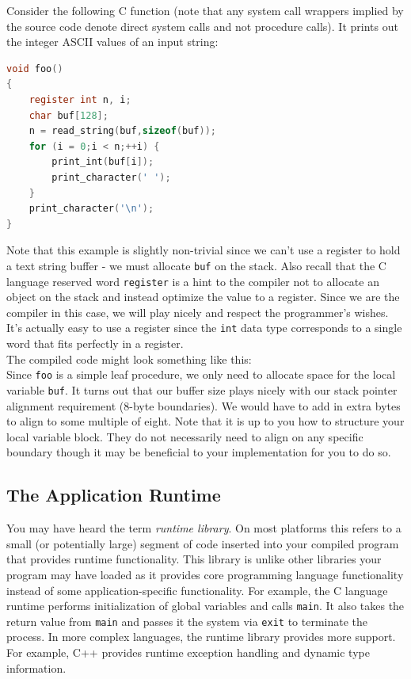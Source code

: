 \documentclass[12pt]{article}
\begin{document}
Consider the following C function (note that any system call wrappers implied by
     the source code denote direct system calls and not procedure calls). It
     prints out the integer ASCII values of an input string:\\

\begin{lstlisting}[language=C]
void foo()
{
    register int n, i;
    char buf[128];
    n = read_string(buf,sizeof(buf));
    for (i = 0;i < n;++i) {
        print_int(buf[i]);
        print_character(' ');
    }
    print_character('\n');
}
\end{lstlisting}

Note that this example is slightly non-trivial since we can't use a register to
     hold a text string buffer - we must allocate \texttt{buf} on the
     stack. Also recall that the C language reserved word \texttt{register} is a
     hint to the compiler not to allocate an object on the stack and instead
     optimize the value to a register. Since we are the compiler in this case,
     we will play nicely and respect the programmer's wishes. It's actually easy
     to use a register since the \texttt{int} data type corresponds to a single
     word that fits perfectly in a register.\\

The compiled code might look something like this:\\



Since \texttt{foo} is a simple leaf procedure, we only need to allocate space
     for the local variable \texttt{buf}. It turns out that our buffer size
     plays nicely with our stack pointer alignment requirement (8-byte
     boundaries). We would have to add in extra bytes to align to some multiple
     of eight. Note that it is up to you how to structure your local variable
     block. They do not necessarily need to align on any specific boundary
     though it may be beneficial to your implementation for you to do so.

\subsection{The Application Runtime}
\label{sec:runtime}

You may have heard the term \textit{runtime library}. On most platforms this
     refers to a small (or potentially large) segment of code inserted into your
     compiled program that provides runtime functionality. This library is
     unlike other libraries your program may have loaded as it provides core
     programming language functionality instead of some application-specific
     functionality. For example, the C language runtime performs initialization
     of global variables and calls \texttt{main}. It also takes the return value
     from \texttt{main} and passes it the system via \texttt{exit} to terminate
     the process. In more complex languages, the runtime library provides more
     support. For example, C++ provides runtime exception handling and dynamic
     type information.\\
\end{document}
